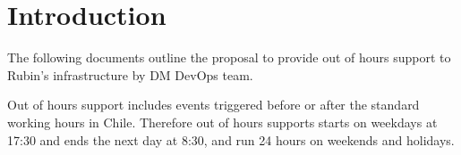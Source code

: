 \section{Introduction}

The following documents outline the proposal to provide out of hours support to Rubin's infrastructure by DM DevOps team. 

Out of hours support includes events triggered before or after the standard working hours in Chile. Therefore out of hours supports starts on weekdays at 17:30 and ends the next day at 8:30, and run 24 hours on weekends and holidays.